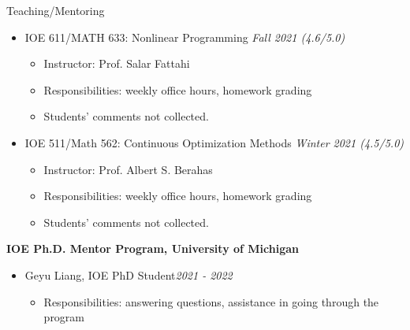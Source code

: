 \documentclass{resume}
\begin{document}
\begin{rSection}{Teaching/Mentoring}
\begin{itemize}
\begin{itemize}
              
        \end{itemize}
        \item IOE 611/MATH 633: Nonlinear Programming \hfill {\em Fall 2021 (4.6/5.0)}
        \begin{itemize}
            \item Instructor: Prof. Salar Fattahi
            \item Responsibilities: weekly office hours, homework grading
            \item Students' comments not collected.
        \end{itemize}
        \item IOE 511/Math 562: Continuous Optimization Methods \hfill {\em Winter 2021 (4.5/5.0)}
        \begin{itemize}
            \item Instructor: Prof. Albert S. Berahas
            \item Responsibilities: weekly office hours, homework grading
            \item Students' comments not collected. 
        \end{itemize}
\end{itemize}
{\bf IOE Ph.D. Mentor Program, University of Michigan}
\begin{itemize}
    \item Geyu Liang, IOE PhD Student\hfill {\em 2021 - 2022}
    \begin{itemize}
      \item Responsibilities: answering questions, assistance in going through the program
  \end{itemize}
\end{itemize}

\end{rSection}
\end{document}
